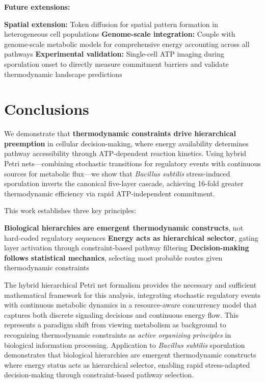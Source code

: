 \documentclass[twocolumn,11pt]{article}
\begin{document}
\textbf{Future extensions:}

\textbf{Spatial extension:} Token diffusion for spatial pattern formation in heterogeneous cell populations
\textbf{Genome-scale integration:} Couple with genome-scale metabolic models for comprehensive energy accounting across all pathways
\textbf{Experimental validation:} Single-cell ATP imaging during sporulation onset to directly measure commitment barriers and validate thermodynamic landscape predictions


\section{Conclusions}

We demonstrate that \textbf{thermodynamic constraints drive hierarchical preemption} in cellular decision-making, where energy availability determines pathway accessibility through ATP-dependent reaction kinetics. Using hybrid Petri nets—combining stochastic transitions for regulatory events with continuous sources for metabolic flux—we show that \textit{Bacillus subtilis} stress-induced sporulation inverts the canonical five-layer cascade, achieving 16-fold greater thermodynamic efficiency via rapid ATP-independent commitment.

This work establishes three key principles:

\textbf{Biological hierarchies are emergent thermodynamic constructs}, not hard-coded regulatory sequences
\textbf{Energy acts as hierarchical selector}, gating layer activation through constraint-based pathway filtering
\textbf{Decision-making follows statistical mechanics}, selecting most probable routes given thermodynamic constraints


The hybrid hierarchical Petri net formalism provides the necessary and sufficient mathematical framework for this analysis, integrating stochastic regulatory events with continuous metabolic dynamics in a resource-aware concurrency model that captures both discrete signaling decisions and continuous energy flow. This represents a paradigm shift from viewing metabolism as background to recognizing thermodynamic constraints as \textit{active organizing principles} in biological information processing. Application to \textit{Bacillus subtilis} sporulation demonstrates that biological hierarchies are emergent thermodynamic constructs where energy status acts as hierarchical selector, enabling rapid stress-adapted decision-making through constraint-based pathway selection.
\end{document}
